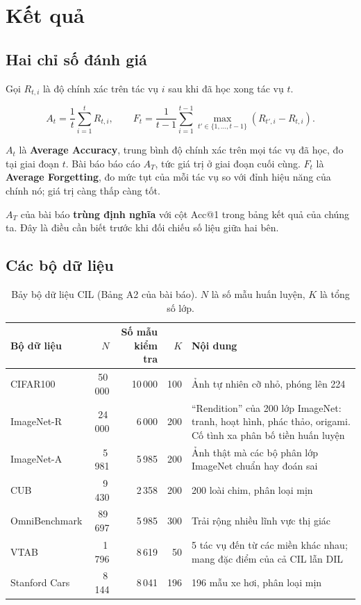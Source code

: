 \documentclass[11pt,a4paper]{article}
\newenvironment{luuy}{\begin{leftbar}\noindent\ignorespaces}{\end{leftbar}}
\begin{document}
\section{Kết quả}

\subsection{Hai chỉ số đánh giá}

Gọi $R_{t,i}$ là độ chính xác trên tác vụ $i$ sau khi đã học xong tác vụ $t$.

\begin{equation}
A_t = \frac{1}{t}\sum_{i=1}^{t} R_{t,i},
\qquad
F_t = \frac{1}{t-1}\sum_{i=1}^{t-1}
      \max_{t' \in \{1,\ldots,t-1\}} \left( R_{t',i} - R_{t,i} \right).
\label{eq:chiso}
\end{equation}

$A_t$ là \textbf{Average Accuracy}, trung bình độ chính xác trên mọi tác vụ đã
học, đo tại giai đoạn $t$. Bài báo báo cáo $A_T$, tức giá trị ở giai đoạn cuối
cùng. $F_t$ là \textbf{Average Forgetting}, đo mức tụt của mỗi tác vụ so với đỉnh
hiệu năng của chính nó; giá trị càng thấp càng tốt.

\begin{luuy}
$A_T$ của bài báo \textbf{trùng định nghĩa} với cột Acc@1 trong bảng kết quả của
chúng ta. Đây là điều cần biết trước khi đối chiếu số liệu giữa hai bên.
\end{luuy}

\subsection{Các bộ dữ liệu}

\begin{table}[htbp]
\centering
\caption{Bảy bộ dữ liệu CIL (Bảng A2 của bài báo). $N$ là số mẫu huấn luyện, $K$
là tổng số lớp.}
\label{tab:dulieu}
\begin{tabular}{lrrrL}
\toprule
Bộ dữ liệu & $N$ & Số mẫu kiểm tra & $K$ & Nội dung \\
\midrule
CIFAR100      & 50\,000 & 10\,000 & 100 & Ảnh tự nhiên cỡ nhỏ, phóng lên 224 \\
ImageNet-R    & 24\,000 & 6\,000  & 200 & ``Rendition'' của 200 lớp ImageNet: tranh, hoạt hình, phác thảo, origami. Cố tình xa phân bố tiền huấn luyện \\
ImageNet-A    & 5\,981  & 5\,985  & 200 & Ảnh thật mà các bộ phân lớp ImageNet chuẩn hay đoán sai \\
CUB           & 9\,430  & 2\,358  & 200 & 200 loài chim, phân loại mịn \\
OmniBenchmark & 89\,697 & 5\,985  & 300 & Trải rộng nhiều lĩnh vực thị giác \\
VTAB          & 1\,796  & 8\,619  & 50  & 5 tác vụ đến từ các miền khác nhau; mang đặc điểm của cả CIL lẫn DIL \\
Stanford Cars & 8\,144  & 8\,041  & 196 & 196 mẫu xe hơi, phân loại mịn \\
\bottomrule
\end{tabular}
\end{table}
\end{document}
